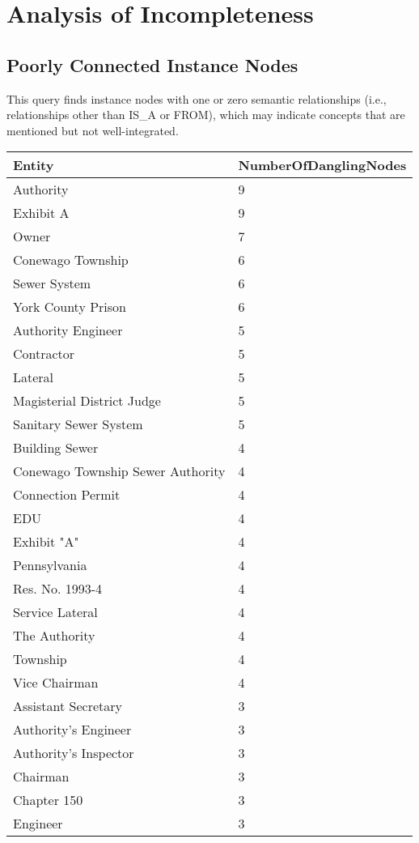 \section{Analysis of Incompleteness}
\subsection*{Poorly Connected Instance Nodes}
This query finds instance nodes with one or zero semantic relationships (i.e., relationships other than IS\_A or FROM), which may indicate concepts that are mentioned but not well-integrated.

\begin{longtable}{p{} p{}}
\toprule
\textbf{Entity} & \textbf{NumberOfDanglingNodes} \\
\midrule
\endfirsthead
\endhead
Authority & 9 \\
Exhibit A & 9 \\
Owner & 7 \\
Conewago Township & 6 \\
Sewer System & 6 \\
York County Prison & 6 \\
Authority Engineer & 5 \\
Contractor & 5 \\
Lateral & 5 \\
Magisterial District Judge & 5 \\
Sanitary Sewer System & 5 \\
Building Sewer & 4 \\
Conewago Township Sewer Authority & 4 \\
Connection Permit & 4 \\
EDU & 4 \\
Exhibit "A" & 4 \\
Pennsylvania & 4 \\
Res. No. 1993-4 & 4 \\
Service Lateral & 4 \\
The Authority & 4 \\
Township & 4 \\
Vice Chairman & 4 \\
Assistant Secretary & 3 \\
Authority's Engineer & 3 \\
Authority's Inspector & 3 \\
Chairman & 3 \\
Chapter 150 & 3 \\
Engineer & 3 \\

\end{longtable}
